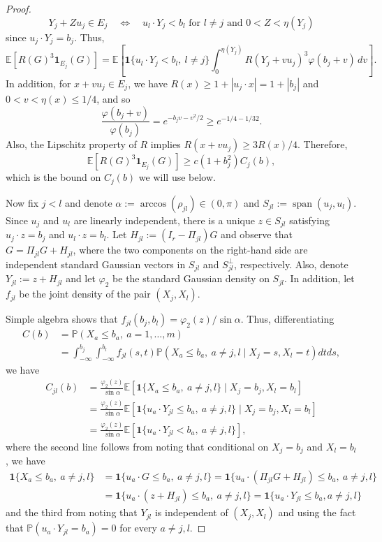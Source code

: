 \documentclass[11pt,letterpaper]{article}
\theoremstyle{remark}
\newcommand{\E}{\mathbb E}
\newcommand{\Pp}{\mathbb P}
\newcommand{\ind}{\mathbf 1}
\begin{document}
\begin{proof}
\[
Y_j + Zu_j \in E_j\quad\Longleftrightarrow\quad u_l\cdot Y_j < b_l\text{ for }{l\neq j}\text{ and }0<Z<\eta(Y_j)
\]
since $u_j\cdot Y_j = b_j$. Thus,
\[
\E[R(G)^3\ind_{E_j}(G)]
=\E\left[
\ind\{u_l\cdot Y_j<b_l,\ l\ne j\}
\int_0^{\eta(Y_j)}
R(Y_j+vu_j)^3\varphi(b_j+v)\,dv
\right].
\]
In addition, for $x+vu_j \in E_j$, we have $R(x) \geq 1+ |u_j\cdot x| = 1+ |b_j|$ and $0<v<\eta(x)\leq 1/4$, and so
\[
 \frac{\varphi(b_j+v)}{\varphi(b_j)}
 =e^{-b_jv-v^2/2}\ge e^{-1/4-1/32}.
\]
Also, the Lipschitz property of \(R\) implies
\(R(x+vu_j)\geq 3R(x)/4\). Therefore,
\begin{equation}
 \E[R(G)^3\ind_{E_j}(G)]
 \ge c(1+b_j^2)C_j(b),
 \label{appx-an:one-region}
\end{equation}
which is the bound on $C_j(b)$ we will use below.




Now fix \(j<l\) and denote
\(\alpha:=\arccos(\rho_{jl})\in(0,\pi)\) and
\(S_{jl}:=\operatorname{span}(u_j, u_l)\).
Since \(u_j\) and \(u_l\) are linearly independent,
there is a unique \(z\in S_{jl}\) satisfying
$u_j\cdot z=b_j$ and $u_l\cdot z=b_l$.
Let \(H_{jl}:=(I_r-\Pi_{jl})G\) and observe that \(G=\Pi_{jl}G+H_{jl}\), where the two components on the right-hand side are independent standard Gaussian vectors in \(S_{jl}\) and \(S_{jl}^\perp\), respectively. Also, denote \(Y_{jl}:=z+H_{jl}\) and let \(\varphi_2\) be the standard Gaussian density on \(S_{jl}\). In addition, let $f_{j l}$ be the joint density of the pair $(X_j,X_l)$.

Simple algebra shows that $f_{j l}(b_j, b_l) = \varphi_2(z)/\sin\alpha$. Thus, differentiating
\begin{align*}
C(b) & = \Pp(X_a\leq b_a, \ a=1,\dots,m) \\
&= \int_{-\infty}^{b_j}\int_{-\infty}^{b_l}f_{jl}(s,t)\Pp(X_a\leq b_a, \ a\neq j,l\mid X_j = s,X_l = t)dt ds,
\end{align*}
we have
\begin{align}
C_{jl}(b) & = \frac{\varphi_2(z)}{\sin\alpha}\E[\ind\{X_a \leq b_a, \ a\neq j,l\} \mid X_j = b_j, X_l = b_l] \nonumber\\
& = \frac{\varphi_2(z)}{\sin\alpha}
\E[\ind\{u_a\cdot Y_{jl}\leq b_a,\ a\ne j,l\}\mid X_j=b_j,X_l=b_l] \nonumber \\
& = \frac{\varphi_2(z)}{\sin\alpha}
\E[\ind\{u_a\cdot Y_{jl} <  b_a,\ a\ne j,l\}],\label{appx-an:two-density}
\end{align}
where the second line follows from noting that conditional on $X_j=b_j$ and $X_l = b_l$, we have 
\begin{align*}
\ind\{X_a\leq b_a, \ a\neq j,l\} 
&= \ind\{u_a\cdot G\leq b_a, \ a\neq j,l\} = \ind\{ u_a\cdot(\Pi_{jl} G + H_{jl}) \leq b_a,\ a\neq j,l \} \\
& = \ind\{u_a\cdot (z + H_{jl})\leq b_a, \ a\neq j,l\} = \ind\{u_a\cdot Y_{jl}\leq b_a, a\neq j,l\}
\end{align*}
and the third from noting that $Y_{jl}$ is independent of $(X_j,X_l)$ and using the fact that
\(\Pp(u_a\cdot Y_{jl}=b_a)=0\) for every \(a\ne j,l\).


\end{proof}
\end{document}
